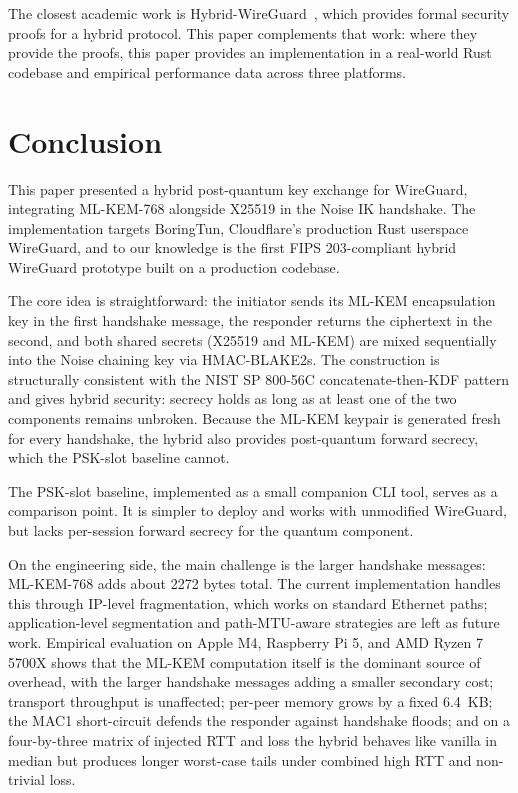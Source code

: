 \documentclass[11pt,a4paper]{article}
\begin{document}
The closest academic work is Hybrid-WireGuard~\cite{lafourcade2025hybrid}, which provides formal security proofs for a hybrid protocol. This paper complements that work: where they provide the proofs, this paper provides an implementation in a real-world Rust codebase and empirical performance data across three platforms.

\section{Conclusion}
\label{sec:conclusion}

This paper presented a hybrid post-quantum key exchange for WireGuard, integrating ML-KEM-768 alongside X25519 in the Noise IK handshake. The implementation targets BoringTun, Cloudflare's production Rust userspace WireGuard, and to our knowledge is the first FIPS 203-compliant hybrid WireGuard prototype built on a production codebase.

The core idea is straightforward: the initiator sends its ML-KEM encapsulation key in the first handshake message, the responder returns the ciphertext in the second, and both shared secrets (X25519 and ML-KEM) are mixed sequentially into the Noise chaining key via HMAC-BLAKE2s. The construction is structurally consistent with the NIST SP 800-56C concatenate-then-KDF pattern and gives hybrid security: secrecy holds as long as at least one of the two components remains unbroken. Because the ML-KEM keypair is generated fresh for every handshake, the hybrid also provides post-quantum forward secrecy, which the PSK-slot baseline cannot.

The PSK-slot baseline, implemented as a small companion CLI tool, serves as a comparison point. It is simpler to deploy and works with unmodified WireGuard, but lacks per-session forward secrecy for the quantum component.

On the engineering side, the main challenge is the larger handshake messages: ML-KEM-768 adds about 2272 bytes total. The current implementation handles this through IP-level fragmentation, which works on standard Ethernet paths; application-level segmentation and path-MTU-aware strategies are left as future work. Empirical evaluation on Apple M4, Raspberry Pi 5, and AMD Ryzen 7 5700X shows that the ML-KEM computation itself is the dominant source of overhead, with the larger handshake messages adding a smaller secondary cost; transport throughput is unaffected; per-peer memory grows by a fixed 6.4~KB; the MAC1 short-circuit defends the responder against handshake floods; and on a four-by-three matrix of injected RTT and loss the hybrid behaves like vanilla in median but produces longer worst-case tails under combined high RTT and non-trivial loss.
\end{document}
